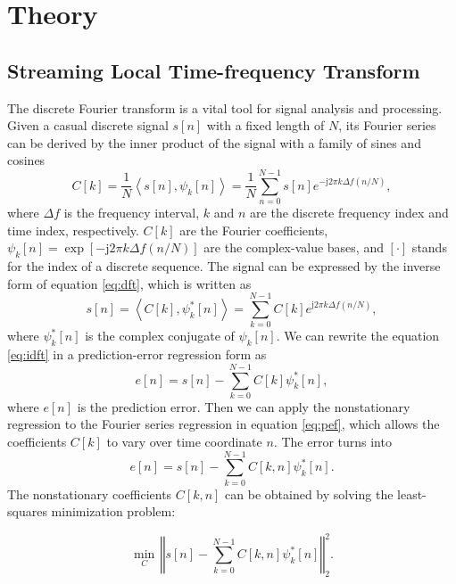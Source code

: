 \section{Theory}
\subsection{Streaming Local Time-frequency Transform}
The discrete Fourier transform is a vital tool for signal analysis and
processing. Given a casual discrete signal $s[n]$ with a fixed length
of $N$, its Fourier series can be derived by the inner product of the
signal with a family of sines and cosines
\begin{equation}
	\label{eq:dft}
	C[k] = \frac{1}{N}\left< s[n],\psi_k[n] \right> = \frac{1}{N}\sum_{n=0}^{N-1} s[n]e^{-\text{j}2\pi k\Delta f (n/N)},
\end{equation}
\noindent where $\Delta f$ is the frequency interval, $k$ and $n$ are the
discrete frequency index and time index, respectively. $C[k]$ are the
Fourier coefficients, $\psi_k[n] = \exp\left[-\text{j}2\pi k\Delta f
(n/N)\right]$ are the complex-value bases, and $[\cdot]$ stands for
the index of a discrete sequence. The signal can be expressed by the
inverse form of equation \ref{eq:dft}, which is written as
\begin{equation}
	\label{eq:idft} s[n] = \left< C[k] ,\psi^*_k[n] \right>
	= \sum_{k=0}^{N-1} C[k]e^{\text{j}2\pi k\Delta f (n/N)},
\end{equation}
where $\psi^*_k[n]$ is the complex conjugate of $\psi_k[n]$.  We can
rewrite the equation \ref{eq:idft} in a prediction-error regression
form as\\
\begin{equation}
	\label{eq:pef}
    e[n] = s[n] - \sum_{k=0}^{N-1} C[k] \psi^*_k[n],
\end{equation}
\noindent where $e[n]$ is the prediction error. Then we can apply the
nonstationary regression \cite[]{Fomel09} to the Fourier series
regression in equation \ref{eq:pef}, which allows the coefficients
$C[k]$ to vary over time coordinate $n$. The error turns
into \cite[]{Fomel09}
\begin{equation}
	\label{eq:npef} e[n] = s[n] - \sum_{k=0}^{N-1}
    C[k,n] \psi^*_k[n].
\end{equation}
The nonstationary coefficients $C[k,n]$ can be obtained by solving the
least-squares minimization problem\cite[]{Liu13}:

\begin{equation}
	\label{eq:lsdft}
	\min_{C}\,\left\Vert s[n]-\sum_{k=0}^{N-1} C[k,n] \psi_k^{*}[n]\right\Vert_2^2.
\end{equation}

